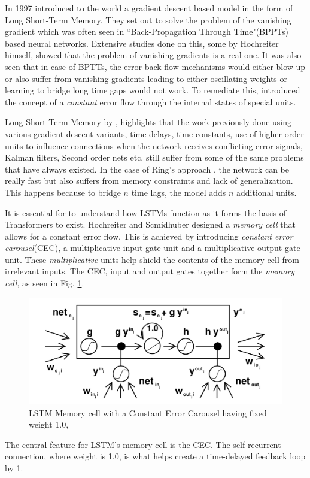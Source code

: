\documentclass[a4paper,12pt]{report}
\begin{document}
            In 1997 \citep{lstmoriginal} introduced to the world a gradient descent based model in the form of Long Short-Term Memory. They set out to solve the problem of the vanishing gradient which was often seen in ``Back-Propagation Through Time"(BPPTs) based neural networks. Extensive studies done on this, some by Hochreiter himself, showed that the problem of vanishing gradients is a real one. It was also seen that in case of BPTTs, the error back-flow mechanisms would either blow up or also suffer from vanishing gradients leading to either oscillating weights or learning to bridge long time gaps would not work. To remediate this, \citep{lstmoriginal} introduced the concept of a \textit{constant} error flow through the internal states of special units.

            Long Short-Term Memory by \citep{lstmoriginal}, highlights that the work previously done using various gradient-descent variants, time-delays, time constants, use of higher order units to influence connections when the network receives conflicting error signals, Kalman filters, Second order nets etc. still suffer from some of the same problems that have always existed. In the case of Ring's approach \citep{lstmRing}, the network can be really fast but also suffers from memory constraints and lack of generalization. This happens because to bridge $ n $ time lags, the model adds $ n $ additional units.

            It is essential for to understand how LSTMs function as it forms the basis of Transformers to exist. Hochreiter and Scmidhuber designed a \textit{memory cell} that  allows for a constant error flow. This is achieved by introducing \textit{constant error carousel}(CEC), a multiplicative input gate unit and a multiplicative output gate unit. These \textit{multiplicative} units help shield the contents of the memory cell from irrelevant inputs. The CEC, input and output gates together form the \textit{memory cell}, as seen in Fig. \ref{lstmCEC}.
           	\begin{figure}[h!]
      				\includegraphics[scale=0.35]{../images/lstm-memorycell.png}
      				\caption{LSTM Memory cell with a Constant Error Carousel having fixed weight 1.0, \citep{lstmoriginal}}\label{lstmCEC}
             \end{figure}
            The central feature for LSTM's memory cell is the CEC. The self-recurrent connection, where weight is 1.0, is what helps create a time-delayed feedback loop by 1.
\end{document}
